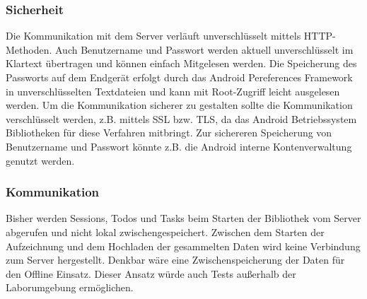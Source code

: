 \subsubsection{Sicherheit}
Die Kommunikation mit dem Server verläuft unverschlüsselt mittels \ac{HTTP}-Methoden.
Auch Benutzername und Passwort werden aktuell unverschlüsselt im Klartext übertragen und können einfach Mitgelesen werden.
Die Speicherung des Passworts auf dem Endgerät erfolgt durch das Android Pereferences Framework in unverschlüsselten Textdateien und kann mit Root-Zugriff leicht ausgelesen werden.  
Um die Kommunikation sicherer zu gestalten sollte die Kommunikation verschlüsselt werden, z.B. mittels \ac{SSL} bzw. \ac{TLS}, da das Android Betriebssystem Bibliotheken für diese Verfahren mitbringt.
Zur sichereren Speicherung von Benutzername und Passwort könnte z.B. die Android interne Kontenverwaltung genutzt werden.

\subsubsection{Kommunikation}
Bisher werden Sessions, Todos und Tasks beim Starten der Bibliothek vom Server abgerufen und nicht lokal zwischengespeichert. 
Zwischen dem Starten der Aufzeichnung und dem Hochladen der gesammelten Daten wird keine Verbindung zum Server hergestellt.
Denkbar wäre eine Zwischenspeicherung der Daten für den Offline Einsatz.
Dieser Ansatz würde auch Tests außerhalb der Laborumgebung ermöglichen.
